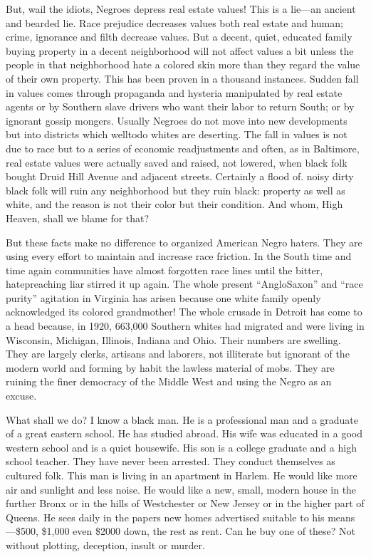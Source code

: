 \documentclass[letterpaper,10pt,english]{jupyterBook}
\begin{document}
\sphinxAtStartPar
But, wail the idiots, Negroes depress real estate values! This is a lie—an ancient and bearded lie. Race prejudice decreases values both real estate and human; crime, ignorance and filth decrease values. But a decent, quiet, educated family buying property in a decent neighborhood will not affect values a bit unless the people in that neighborhood hate a colored skin more than they regard the value of their own property. This has been proven in a thousand instances. Sudden fall in values comes through propaganda and hysteria manipulated by real estate agents or by Southern slave drivers who want their labor to return South; or by ignorant gossip mongers. Usually Negroes do not move into new developments but into districts which well\sphinxhyphen{}to\sphinxhyphen{}do whites are deserting. The fall in values is not due to race but to a series of economic readjustments and often, as in Baltimore, real estate values were actually saved and raised, not lowered, when black folk bought Druid Hill Avenue and adjacent streets. Certainly a flood of. noisy dirty black folk will ruin any neighborhood but they ruin black: property as well as white, and the reason is not their color but their condition. And whom, High Heaven, shall we blame for that?



\sphinxAtStartPar
But these facts make no difference to organized American Negro haters. They are using every effort to maintain and increase race friction. In the South time and time again communities have almost forgotten race lines until the bitter, hate\sphinxhyphen{}preaching liar stirred it up again. The whole present “Anglo\sphinxhyphen{}Saxon” and “race purity” agitation in Virginia has arisen because one white family openly acknowledged its colored grandmother! The whole crusade in Detroit has come to a head because, in 1920, 663,000 Southern whites had migrated and were living in Wisconsin, Michigan, Illinois, Indiana and Ohio. Their numbers are swelling. They are largely clerks, artisans and laborers, not illiterate but ignorant of the modern world and forming by habit the lawless material of mobs. They are ruining the finer democracy of the Middle West and using the Negro as an excuse.

\sphinxAtStartPar
What shall we do? I know a black man. He is a professional man and a graduate of a great eastern school. He has studied abroad. His wife was educated in a good western school and is a quiet housewife. His son is a college graduate and a high school teacher. They have never been arrested. They conduct themselves as cultured folk. This man is living in an apartment in Harlem. He would like more air and sunlight and less noise. He would like a new, small, modern house in the further Bronx or in the hills of Westchester or New Jersey or in the higher part of Queens. He sees daily in the papers new homes advertised suitable to his means—\$500, \$1,000 even \$2000 down, the rest as rent. Can he buy one of these? Not without plotting, deception, insult or murder.
\end{document}
